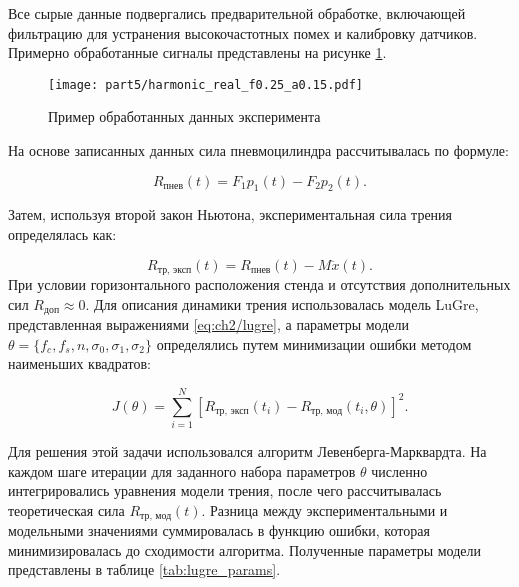 Все сырые данные подвергались предварительной обработке, включающей фильтрацию для устранения высокочастотных помех
и калибровку датчиков. Примерно обработанные сигналы представлены на рисунке \ref{fig:raw_data}.

\begin{figure}[ht]
	\centering
	\texttt{[image: part5/harmonic\_real\_f0.25\_a0.15.pdf]}
	\caption{Пример обработанных данных эксперимента}\label{fig:raw_data}
\end{figure}

На основе записанных данных сила пневмоцилиндра рассчитывалась по формуле:

\begin{equation}
	R_\text{пнев}(t) = F_1 p_1(t) - F_2 p_2(t).
\end{equation}

Затем, используя второй закон Ньютона, экспериментальная сила трения определялась как:

\begin{equation}
	R_\text{тр, эксп}(t) = R_\text{пнев}(t) - M \ddot{x}(t).
\end{equation}
При условии горизонтального расположения стенда и отсутствия дополнительных сил $R_\text{доп} \approx 0$.
Для описания динамики трения использовалась модель LuGre, представленная выражениями \ref{eq:ch2/lugre},
а параметры модели $\theta = \{f_c, f_s, n, \sigma_0, \sigma_1, \sigma_2\}$ определялись путем минимизации ошибки
методом наименьших квадратов:

\begin{equation}
	J(\theta) = \sum_{i=1}^N \left[ R_\text{тр, эксп}(t_i) - R_\text{тр, мод}(t_i, \theta) \right]^2.
\end{equation}

Для решения этой задачи использовался алгоритм Левенберга-Марквардта.
На каждом шаге итерации для заданного набора параметров $\theta$ численно интегрировались уравнения модели
трения, после чего рассчитывалась теоретическая сила $R_\text{тр, мод}(t)$. Разница
между экспериментальными и модельными значениями суммировалась
в функцию ошибки, которая минимизировалась до сходимости алгоритма. Полученные параметры модели
представлены в таблице \ref{tab:lugre_params}.

